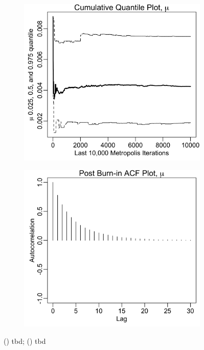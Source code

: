 \documentclass{uwstat572}
\begin{document}
\begin{figure}[H]
	\centering
	\begin{subfigure}[b]{0.49\textwidth}
		\includegraphics[width=\textwidth]{figures/mcmc_cum_quant_plot_mu.png}
		\caption{}
		\label{fig:quant_mu}
	\end{subfigure}
	\hfill
	\begin{subfigure}[b]{0.49\textwidth}
		\includegraphics[width=\textwidth]{figures/mcmc_acf_plot_mu.png}
		\caption{}
		\label{fig:acf_mu}
	\end{subfigure}
	\caption{() tbd; () tbd }
	\label{fig:data_plot}
\end{figure} 
\end{document}
